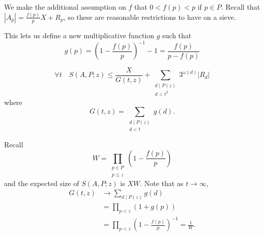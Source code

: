 \documentclass{article}
\newcommand{\1}{\mathbbm{1}}
\begin{document}
We make the additional assumption on $f$ that $0 < f(p) < p$ if $p \in P$. Recall that $|A_p| = \frac{f(p)}{p} X + R_p$, so these are reasonable restrictions to have on a sieve.

This lets us define a new multiplicative function $g$ such that
\begin{equation*}
  g(p) = \left(1 - \frac{f(p)}{p}\right)^{-1} -1 = \frac{f(p)}{p - f(p)}
\end{equation*}
\begin{nthm}\label{thm:2.3}
  \begin{equation*}
    \forall t \quad S(A,P;z) \leq \frac{X}{G(t,z)} + \sum_{\substack{d \mid P(z) \\ d < t^2}} 3^{\omega(d)} |R_d|
  \end{equation*}
  where
  \begin{equation*}
    G(t,z) = \sum_{\substack{d \mid P(z) \\ d < t}} g(d).
  \end{equation*}
\end{nthm}
Recall
\begin{equation*}
  W = \prod_{\substack{p \in P \\ p \leq z}} \left(1 - \frac{f(p)}{p}\right)
\end{equation*}
and the expected size of $S(A,P;z)$ is $XW$. Note that as $t \to \infty$,
\begin{align*}
  G(t,z) &\to \sum_{d \mid P(z)} g(d) \\
         &= \prod_{p < z} (1 + g(p)) \\
         &= \prod_{p < z} \left(1 - \frac{f(p)}{p}\right)^{-1} = \frac{1}{W}.
\end{align*}
\end{document}
